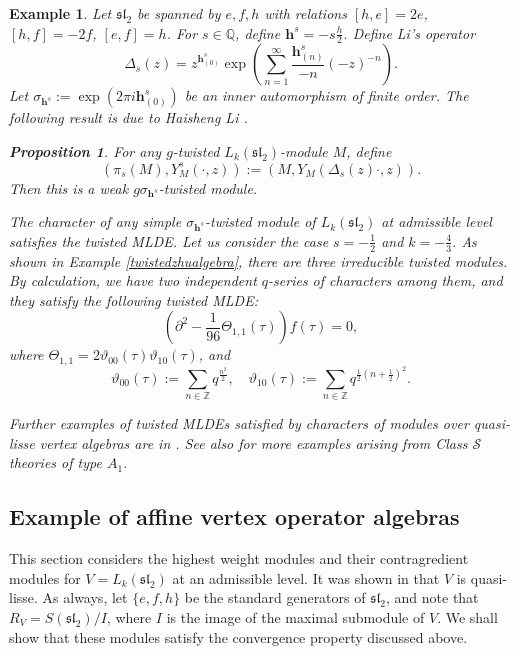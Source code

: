 \documentclass[9pt]{amsart}
\newtheorem{proposition}{Proposition}[section]
\newtheorem{example}{Example}[section]
\begin{document}
\begin{example}
Let $\mathfrak{sl}_2$ be spanned by $e, f, h$ with relations $[h, e] = 2e$, $[h, f] = -2f$, $[e, f] = h$. For $s \in \mathbb{Q}$, define $\mathbf{h}^s = -s \frac{h}{2}$. Define Li's operator \cite{li1996local}
\[
\Delta_s(z) = z^{\mathbf{h}^s_{(0)}} \exp\left( \sum_{n = 1}^\infty \frac{\mathbf{h}^s_{(n)}}{-n} (-z)^{-n} \right).
\]
Let $\sigma_{\mathbf{h}^s} := \exp(2\pi i \mathbf{h}^s_{(0)})$ be an inner automorphism of finite order. The following result is due to Haisheng Li \cite[Proposition 5.4]{li1996local}.

\begin{proposition}
For any $g$-twisted $L_k({\mathfrak{sl}_2})$-module $M$, define
\[
(\pi_s(M), Y_M^s(\cdot, z)) := 
(M, Y_M(\Delta_s(z)\cdot, z)).
\]
Then this is a weak $g \sigma_{\mathbf{h}^s}$-twisted module.
\end{proposition}

The character of any simple $\sigma_{\mathbf{h}^s}$-twisted module of $L_k({\mathfrak{sl}_2})$ at admissible level satisfies the twisted MLDE. Let us consider the case $s = -\frac{1}{2}$ and $k = -\frac{4}{3}$. As shown in Example \ref{twistedzhualgebra}, there are three irreducible twisted modules. By calculation, we have two independent $q$-series of characters among them, and they satisfy the following twisted MLDE:
\[
\left( \partial^2 - \frac{1}{96} \Theta_{1,1}(\tau) \right) f(\tau) = 0,
\]
where $\Theta_{1,1} = 2 \vartheta_{00}(\tau) \vartheta_{10}(\tau)$, and
\[
\vartheta_{00}(\tau) := \sum_{n \in \mathbb{Z}} q^{\frac{n^2}{2}}, \quad
\vartheta_{10}(\tau) := \sum_{n \in \mathbb{Z}} q^{\frac{1}{2} (n + \frac{1}{2})^2}.
\]

\noindent Further examples of twisted MLDEs satisfied by characters of modules over quasi-lisse vertex algebras are in \cite{LLY2023spectral}. See also \cite{zheng2022surface} for more examples arising from Class $\mathcal{S}$ theories of type $A_1$.
\end{example}



\subsection{Example of affine vertex operator algebras} 
This section considers the highest weight modules and their contragredient modules for $V = L_k(\mathfrak{sl}_2)$ at an admissible level. It was shown in \cite{arakawa2015associated} that $V$ is quasi-lisse. As always, let $\{e, f, h\}$ be the standard generators of $\mathfrak{sl}_2$, and note that $R_V = S(\mathfrak{sl}_2)/I$, where $I$ is the image of the maximal submodule of $V$. We shall show that these modules satisfy the convergence property discussed above.
\end{document}
